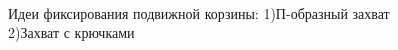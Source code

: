 \begin{enumerate}
\begin{enumerate}
\begin{enumerate}
			\begin{figure}[H]
				\begin{minipage}[h]{0.2\linewidth}
					\center  
				\end{minipage}
				\begin{minipage}[h]{0.6\linewidth}
					\caption{Идеи фиксирования подвижной корзины: 1)П-образный захват 2)Захват с крючками}
				\end{minipage}
			\end{figure}
			
		\end{enumerate}
		

\end{enumerate}
\end{enumerate}

